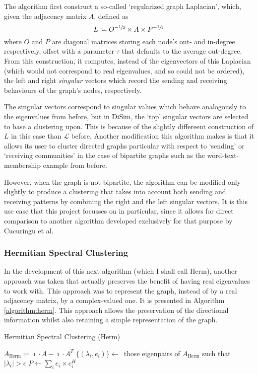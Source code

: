 The algorithm first construct a so-called `regularized graph Laplacian', which, given the 
adjacency matrix $A$, defined as 
$$
	L \coloneqq O^{-\sfrac{1}{2}}\times A\times P^{-\sfrac{1}{2}} 
$$
where $O$ and $P$ are diagonal matrices storing each node's out- and in-degree respectively, 
offset with a parameter $\tau$ that defaults to the average out-degree. From this construction, it 
computes, instead of the eigenvectors of this Laplacian (which would not correspond to real 
eigenvalues, and so could not be ordered), the left and right \emph{singular} vectors which record 
the sending and receiving behaviours of the graph's nodes, respectively. 

The singular vectors correspond to singular values which behave analogously to the eigenvalues 
from before, but in DiSim, the `top' singular vectors are selected to base a clustering upon. 
This is because of the slightly differeent construction of $L$ in this case than $\mathcal{L}$ 
before. Another modification this algorithm makes is that it allows its user to cluster directed 
graphs particular with respect to `sending' or `receiving communities' in the case of bipartite 
graphs such as the word-text-membership example from before. 

However, when the graph is not bipartite, the algorithm can be modified only slightly to produce a 
clustering that takes into account both sending and receiving patterns by combining the right and 
the left singular vectors. It is this use case that this project focusses on in particular, since 
it allows for direct comparison to another algorithm developed exclusively for that purpose by
Cucuringu et al. 

\subsubsection{Hermitian Spectral Clustering}
In the development of this next algorithm (which I shall call Herm), another approach was taken 
that actually preserves the 
benefit of having real eigenvalues to work with. This approach was to represent the graph, instead 
of by a real adjacency matrix, by a complex-valued one. It is presented in Algorithm 
\ref{algorithm:herm}. This approach allows the preservation of the directional information whilst 
also retaining a simple representation of the graph. 
\begin{algorithm}
	\caption{Hermitian Spectral Clustering (Herm) \label{algorithm:herm}}
	\BlankLine
	$A_\mathrm{Herm} \coloneqq \imath \cdot A - \imath\cdot A^T$\;
	$\{(\lambda_i, e_i)\} \longleftarrow$\ those eigenpairs of $A_\mathrm{Herm}$ such that 
	$|\lambda_i| > \epsilon$\;
	$P \longleftarrow \sum_i e_i \times e_i^H$\;
\end{algorithm}

